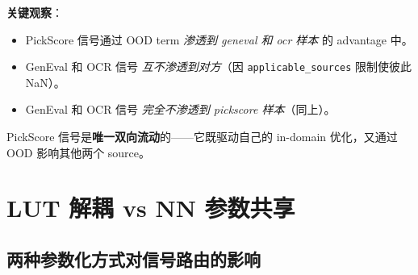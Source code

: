 \documentclass[11pt,a4paper]{article}
\begin{document}
\textbf{关键观察}：
\begin{itemize}
    \item PickScore 信号通过 OOD term \emph{渗透到 geneval 和 ocr 样本} 的 advantage 中。
    \item GenEval 和 OCR 信号 \emph{互不渗透到对方}（因 \texttt{applicable\_sources} 限制使彼此 NaN）。
    \item GenEval 和 OCR 信号 \emph{完全不渗透到 pickscore 样本}（同上）。
\end{itemize}

PickScore 信号是\textbf{唯一双向流动}的——它既驱动自己的 in-domain 优化，又通过 OOD 影响其他两个 source。

\section{LUT 解耦 vs NN 参数共享}
\label{sec:decouple_vs_share}

\subsection{两种参数化方式对信号路由的影响}
\end{document}
